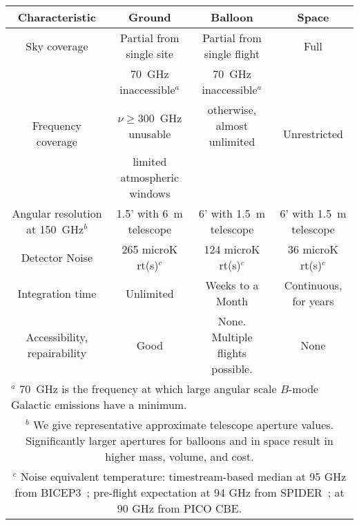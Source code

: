 \documentclass[PICOReport.tex]{subfiles}
\begin{document}
\newcommand{\sizeA}{0.09\textwidth} %
\begin{table}%
\begin{adjustbox}{width=1.2\textwidth,center}
\begin{tabular}{|c|@{\hspace{\sizeA}}c@{\hspace{\sizeA}}|@{\hspace{\sizeA}}c@{\hspace{\sizeA}}|c|}
\hline
\bf{Characteristic} & {\bf Ground} & {\bf Balloon} & {\bf Space}  \\ \hline
Sky coverage & Partial from single site & Partial from single flight & Full \\ \hline
\multirow{3}{*}{Frequency coverage} & 70~GHz inaccessible$^{a}$    & 70~GHz inaccessible$^{a}$       & \multirow{3}{*}{Unrestricted} \\  
                                                           &  $\nu \ge 300$~GHz unusable   &    otherwise, almost unlimited   &                                            \\  
                                                           &     limited atmospheric windows  &                                      &                                           \\ \hline
  Angular resolution at 150~GHz$^{b}$  & 1.5' with 6~m telescope & 6' with 1.5~m telescope & 6' with 1.5~m telescope \\ \hline
   Detector Noise                                    & 265 microK rt(s)$^{c}$  & 124 microK rt(s)$^{c}$ &  36 microK rt(s)$^{c}$ \\  \hline
Integration time                                   & Unlimited & Weeks to a Month & Continuous, for years \\ \hline
Accessibility, repairability                    & Good & None.  Multiple flights possible.& None \\
\hline
\multicolumn{4}{l}{$^{a}$ 70~GHz is the frequency at which large angular scale $B$-mode Galactic emissions have a minimum. } \\
\multicolumn{4}{p{1.7\linewidth}}{$^{b}$ We give representative approximate telescope aperture values. Significantly larger apertures for balloons and in space result in higher mass, volume, and cost.  }\\
\multicolumn{4}{p{1.8\linewidth}}{$^{c}$ Noise equivalent temperature: timestream-based median at 95 GHz from BICEP3~\citep{kang20182017}; pre-flight expectation at 94 GHz from SPIDER~\citep{2014SPIE.9153E..13R}; at 90 GHz from PICO CBE.} \\


\end{tabular}
\end{adjustbox}
\end{table}
\end{document}
